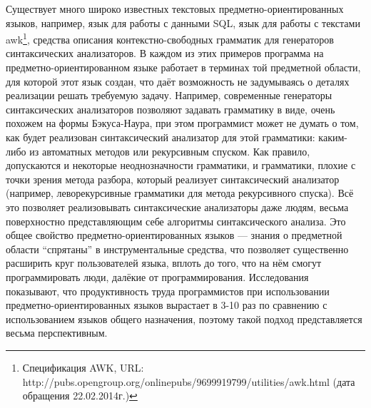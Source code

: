 Существует много широко известных текстовых предметно-ориентированных языков, 
например, язык для работы с данными SQL, язык для работы с текстами 
awk\footnote{Спецификация AWK, URL: http://pubs.opengroup.org/onlinepubs/9699919799/utilities/awk.html (дата обращения 22.02.2014г.)},
средства описания контекстно-свободных грамматик для генераторов синтаксических 
анализаторов. В каждом из этих примеров программа на предметно-ориентированном 
языке работает в терминах той предметной области, для которой этот язык создан,
что даёт возможность не задумываясь о деталях реализации решать требуемую 
задачу. Например, современные генераторы синтаксических анализаторов позволяют 
задавать грамматику в виде, очень похожем на формы Бэкуса-Наура, при этом 
программист может не думать о том, как будет реализован синтаксический 
анализатор для этой грамматики: каким-либо из автоматных методов или рекурсивным 
спуском. Как правило, допускаются и некоторые неоднозначности грамматики, и 
грамматики, плохие с точки зрения метода разбора, который реализует 
синтаксический анализатор (например, леворекурсивные грамматики для метода 
рекурсивного спуска). Всё это позволяет реализовывать синтаксические анализаторы 
даже людям, весьма поверхностно представляющим себе алгоритмы синтаксического 
анализа. Это общее свойство предметно-ориентированных языков --- знания о 
предметной области "`спрятаны"' в инструментальные средства, что позволяет 
существенно расширить круг пользователей языка, вплоть до того, что на нём 
смогут программировать люди, далёкие от программирования. Исследования 
\cite{kieburtz1996software, kelly2000visual, gray2003examination} показывают, 
что продуктивность труда программистов при использовании 
предметно-ориентированных языков вырастает в 3-10 раз по сравнению с 
использованием языков общего назначения, поэтому такой подход представляется 
весьма перспективным.

